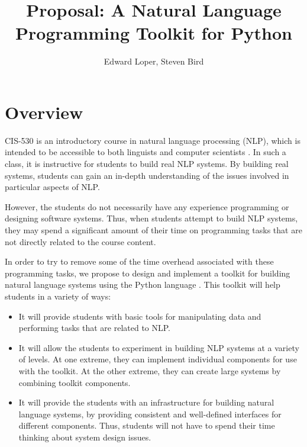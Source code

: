 \documentclass{article}
\begin{document}
\title{Proposal: A Natural Language Programming Toolkit for Python}
\author{Edward Loper, Steven Bird}
\maketitle

\section{Overview}

CIS-530 is an introductory course in natural language processing
(NLP), which is intended to be accessible to both linguists and
computer scientists \cite{cis530}. In such a class, it is instructive
for students to build real NLP systems.  By building real systems,
students can gain an in-depth understanding of the issues involved in
particular aspects of NLP.

However, the students do not necessarily have any experience
programming or designing software systems.  Thus, when students
attempt to build NLP systems, they may spend a significant amount of
their time on programming tasks that are not directly related to the
course content.

In order to try to remove some of the time overhead associated with
these programming tasks, we propose to design and implement a toolkit
for building natural language systems using the Python
language \cite{python}. This toolkit will help students in a variety
of ways:

\begin{itemize}
  \item It will provide students with basic tools for manipulating
  data and performing tasks that are related to NLP.

  \item It will allow the students to experiment in building NLP
  systems at a variety of levels.  At one extreme, they can implement
  individual components for use with the toolkit.  At the other
  extreme, they can create large systems by combining toolkit
  components.

  \item It will provide the students with an infrastructure for
  building natural language systems, by providing consistent and
  well-defined interfaces for different components.  Thus, students
  will not have to spend their time thinking about system design
  issues.
\end{itemize}
\end{document}
